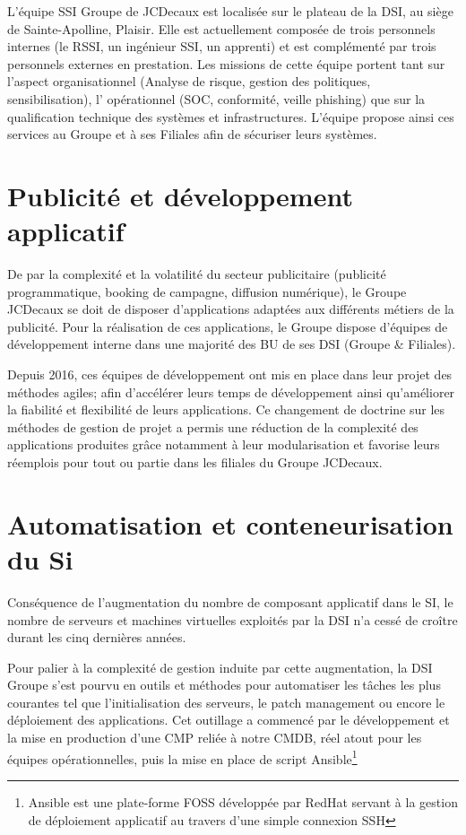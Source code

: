 L'équipe \ac{SSI} Groupe de JCDecaux est localisée sur le plateau de la \ac{DSI}, au siège de Sainte-Apolline, Plaisir.
Elle est actuellement composée de trois personnels internes (le \ac{RSSI}, un ingénieur \ac{SSI}, un apprenti) et est complémenté 
par trois personnels externes en prestation.
\newpage
Les missions de cette équipe portent tant sur l'aspect organisationnel (Analyse de risque, gestion des politiques, sensibilisation),
l' opérationnel (SOC, conformité, veille phishing) que sur la qualification technique des systèmes et infrastructures. L'équipe propose
ainsi ces services au Groupe et à ses Filiales afin de sécuriser leurs systèmes.

\section{Publicité et développement applicatif}
De par la complexité et la volatilité du secteur publicitaire (publicité programmatique, booking de campagne, diffusion numérique), 
le Groupe JCDecaux se doit de disposer d'applications adaptées aux différents métiers de la publicité. 
Pour la réalisation de ces applications, le Groupe dispose d'équipes de développement interne dans une majorité des \ac{BU} 
de ses DSI (Groupe \& Filiales).

Depuis 2016, ces équipes de développement  ont mis en place dans leur projet des méthodes agiles; afin 
d'accélérer leurs temps de développement ainsi qu'améliorer la fiabilité et flexibilité de leurs applications.
Ce changement de doctrine sur les méthodes de gestion de projet a permis une réduction de la complexité des applications produites
grâce notamment à leur modularisation et favorise leurs réemplois pour tout ou partie dans les filiales du Groupe JCDecaux.

\section{Automatisation et conteneurisation du Si}
Conséquence de l'augmentation du nombre de composant applicatif dans le SI, le nombre de serveurs et machines virtuelles exploités par 
la \ac{DSI} n'a cessé de croître durant les cinq dernières années.

Pour palier à la complexité de gestion induite par cette augmentation, la \ac{DSI} Groupe s'est pourvu en outils et méthodes pour 
automatiser les tâches les plus courantes tel que l'initialisation des serveurs, le patch management ou encore le déploiement des
applications. Cet outillage a commencé par le développement et la mise en production d'une \ac{CMP} reliée à notre \ac{CMDB}, réel atout 
pour les équipes opérationnelles, puis la mise en place de script Ansible\footnote{Ansible est une plate-forme \ac{FOSS} développée par
RedHat servant à la gestion de déploiement applicatif au travers d'une simple connexion \ac{SSH}}

